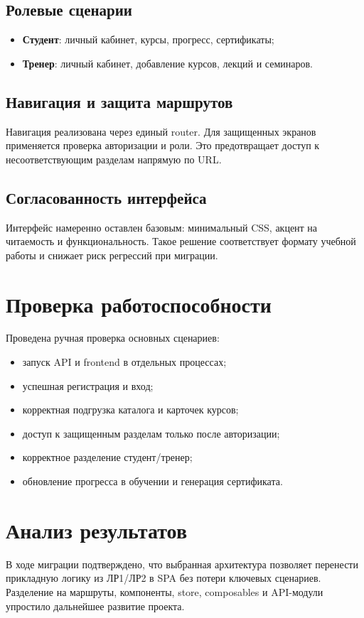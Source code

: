 \documentclass[a4paper,12pt]{article}
\begin{document}
\subsection{Ролевые сценарии}
\begin{itemize}
    \item \textbf{Студент}: личный кабинет, курсы, прогресс, сертификаты;
    \item \textbf{Тренер}: личный кабинет, добавление курсов, лекций и семинаров.
\end{itemize}

\subsection{Навигация и защита маршрутов}
Навигация реализована через единый router. Для защищенных экранов применяется проверка авторизации и роли. Это предотвращает доступ к несоответствующим разделам напрямую по URL.

\subsection{Согласованность интерфейса}
Интерфейс намеренно оставлен базовым: минимальный CSS, акцент на читаемость и функциональность. Такое решение соответствует формату учебной работы и снижает риск регрессий при миграции.

\section{Проверка работоспособности}
Проведена ручная проверка основных сценариев:
\begin{itemize}
    \item запуск API и frontend в отдельных процессах;
    \item успешная регистрация и вход;
    \item корректная подгрузка каталога и карточек курсов;
    \item доступ к защищенным разделам только после авторизации;
    \item корректное разделение студент/тренер;
    \item обновление прогресса в обучении и генерация сертификата.
\end{itemize}

\section{Анализ результатов}
В ходе миграции подтверждено, что выбранная архитектура позволяет перенести прикладную логику из ЛР1/ЛР2 в SPA без потери ключевых сценариев. Разделение на маршруты, компоненты, store, composables и API-модули упростило дальнейшее развитие проекта.
\end{document}
